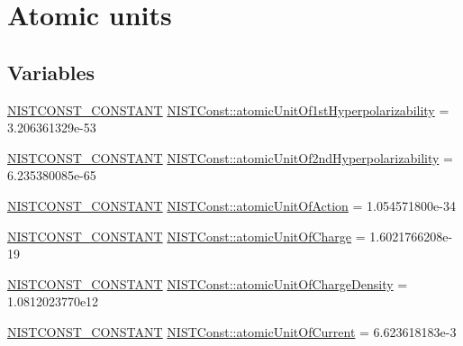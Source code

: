 \hypertarget{group___n_i_s_t_const-_atomic_unit}{}\section{Atomic units}
\label{group___n_i_s_t_const-_atomic_unit}
\subsection*{Variables}
\begin{DoxyCompactItemize}
\item 
\mbox{\hyperlink{group___n_i_s_t_const-_macros_ga2b0fc1d7452373f816175dd86ce26729}{N\+I\+S\+T\+C\+O\+N\+S\+T\+\_\+\+C\+O\+N\+S\+T\+A\+NT}} \mbox{\hyperlink{group___n_i_s_t_const-_atomic_unit_gaa8a2a7516740737167afdeb3cd4ee584}{N\+I\+S\+T\+Const\+::atomic\+Unit\+Of1st\+Hyperpolarizability}} = 3.\+206361329e-\/53
\item 
\mbox{\hyperlink{group___n_i_s_t_const-_macros_ga2b0fc1d7452373f816175dd86ce26729}{N\+I\+S\+T\+C\+O\+N\+S\+T\+\_\+\+C\+O\+N\+S\+T\+A\+NT}} \mbox{\hyperlink{group___n_i_s_t_const-_atomic_unit_gabcc03469254baef16a69abd058ae5ada}{N\+I\+S\+T\+Const\+::atomic\+Unit\+Of2nd\+Hyperpolarizability}} = 6.\+235380085e-\/65
\item 
\mbox{\hyperlink{group___n_i_s_t_const-_macros_ga2b0fc1d7452373f816175dd86ce26729}{N\+I\+S\+T\+C\+O\+N\+S\+T\+\_\+\+C\+O\+N\+S\+T\+A\+NT}} \mbox{\hyperlink{group___n_i_s_t_const-_atomic_unit_ga7f1326edcbb03c0df4c2e81afcea7ac8}{N\+I\+S\+T\+Const\+::atomic\+Unit\+Of\+Action}} = 1.\+054571800e-\/34
\item 
\mbox{\hyperlink{group___n_i_s_t_const-_macros_ga2b0fc1d7452373f816175dd86ce26729}{N\+I\+S\+T\+C\+O\+N\+S\+T\+\_\+\+C\+O\+N\+S\+T\+A\+NT}} \mbox{\hyperlink{group___n_i_s_t_const-_atomic_unit_gaa850ac93fa2ec31582147af4bcafd984}{N\+I\+S\+T\+Const\+::atomic\+Unit\+Of\+Charge}} = 1.\+6021766208e-\/19
\item 
\mbox{\hyperlink{group___n_i_s_t_const-_macros_ga2b0fc1d7452373f816175dd86ce26729}{N\+I\+S\+T\+C\+O\+N\+S\+T\+\_\+\+C\+O\+N\+S\+T\+A\+NT}} \mbox{\hyperlink{group___n_i_s_t_const-_atomic_unit_gaaeb55a2b43e7885495495e2a613eb481}{N\+I\+S\+T\+Const\+::atomic\+Unit\+Of\+Charge\+Density}} = 1.\+0812023770e12
\item 
\mbox{\hyperlink{group___n_i_s_t_const-_macros_ga2b0fc1d7452373f816175dd86ce26729}{N\+I\+S\+T\+C\+O\+N\+S\+T\+\_\+\+C\+O\+N\+S\+T\+A\+NT}} \mbox{\hyperlink{group___n_i_s_t_const-_atomic_unit_ga664164b535c0f978a02afff805d58a34}{N\+I\+S\+T\+Const\+::atomic\+Unit\+Of\+Current}} = 6.\+623618183e-\/3

\end{DoxyCompactItemize}

